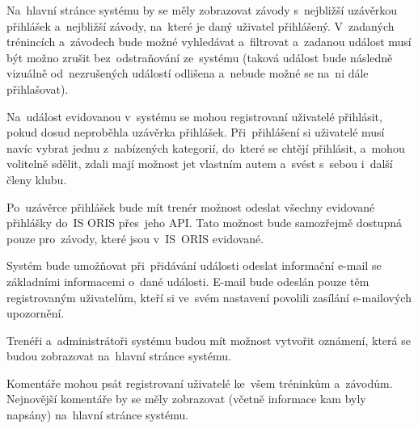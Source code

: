\begin{enumerate}[label=\textcolor{decoration}{\textbf{F\arabic*}}]
	Na~hlavní stránce systému by se měly zobrazovat závody s~nejbližší uzávěrkou přihlášek a~nejbližší závody, na~které je daný uživatel přihlášený. V~zadaných trénincích a~závodech bude možné vyhledávat a~filtrovat a~zadanou událost musí být možno zrušit bez~odstraňování ze~systému (taková událost bude následně vizuálně od~nezrušených událostí odlišena a~nebude možné se na~ni dále přihlašovat).

	Na~událost evidovanou v~systému se mohou registrovaní uživatelé přihlásit, pokud dosud neproběhla uzávěrka přihlášek. Při~přihlášení si uživatelé musí navíc vybrat jednu z~nabízených kategorií, do~které se chtějí přihlásit, a~mohou volitelně sdělit, zdali mají možnost jet vlastním autem a~svést s~sebou i~další členy klubu.

	Po~uzávěrce přihlášek bude mít trenér možnost odeslat všechny evidované přihlášky do~IS ORIS přes~jeho API. Tato možnost bude samozřejmě dostupná pouze pro~závody, které jsou v~IS~ORIS evidované.

	Systém bude umožňovat při~přidávání události odeslat informační e-mail se základními informacemi o~dané události. E-mail bude odeslán pouze těm registrovaným uživatelům, kteří si ve~svém nastavení povolili zasílání e-mailových upozornění.

	Trenéři a~administrátoři systému budou mít možnost vytvořit oznámení, která se budou zobrazovat na~hlavní stránce systému.

	Komentáře mohou psát registrovaní uživatelé ke~všem tréninkům a~závodům. Nejnovější komentáře by se měly zobrazovat (včetně informace kam byly napsány) na~hlavní stránce systému.
\end{enumerate}

